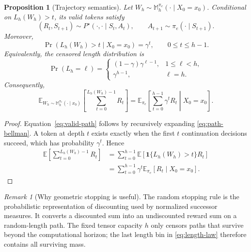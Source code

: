 \documentclass[11pt]{article}
\newtheorem{proposition}[theorem]{Proposition}
\theoremstyle{definition}
\theoremstyle{remark}
\newtheorem{remark}[theorem]{Remark}
\newcommand{\E}{\mathbb E}
\newcommand{\targetpi}{\pi_e}
\begin{document}
\begin{proposition}[Trajectory semantics]
\label{prop:path-semantics}
Let $W_h\sim\mathbb M_h^{\targetpi}(\cdot\mid X_0=x_0)$. Conditional on
$L_h(W_h)>t$, its valid tokens satisfy
\begin{equation}
(R_t,S_{t+1})
\sim
P^\star(\cdot,\cdot\mid S_t,A_t),
\qquad
A_{t+1}
\sim
\targetpi(\cdot\mid S_{t+1}).
\label{eq:valid-path}
\end{equation}
Moreover,
\begin{equation}
\Pr(L_h(W_h)>t\mid X_0=x_0)=\gamma^t,
\qquad
0\leq t\leq h-1.
\label{eq:survival}
\end{equation}
Equivalently, the censored length distribution is
\begin{equation}
\boxed{
\Pr(L_h=\ell)
=
\begin{cases}
(1-\gamma)\gamma^{\ell-1}, & 1\leq \ell<h,\\
\gamma^{h-1}, & \ell=h.
\end{cases}
}
\label{eq:length-law}
\end{equation}
Consequently,
\begin{equation}
\boxed{
\E_{W_h\sim\mathbb M_h^{\targetpi}(\cdot\mid x_0)}
\left[
\sum_{t=0}^{L_h(W_h)-1}R_t
\right]
=
\E_{\targetpi}
\left[
\sum_{t=0}^{h-1}\gamma^tR_t
\middle|
X_0=x_0
\right].
}
\label{eq:value-identity}
\end{equation}
\end{proposition}

\begin{proof}
Equation~\eqref{eq:valid-path} follows by recursively expanding
\cref{eq:path-bellman}. A token at depth $t$ exists exactly when the first
$t$ continuation decisions succeed, which has probability $\gamma^t$. Hence
\begin{align}
\E\left[\sum_{t=0}^{L_h(W_h)-1}R_t\right]
&=
\sum_{t=0}^{h-1}
\E\left[\bm 1\{L_h(W_h)>t\}R_t\right]
\\
&=
\sum_{t=0}^{h-1}
\gamma^t\E_{\targetpi}[R_t\mid X_0=x_0].
\end{align}
\end{proof}

\begin{remark}[Why geometric stopping is useful]
The random stopping rule is the probabilistic representation of
discounting used by normalized successor measures. It converts a discounted
sum into an undiscounted reward sum on a random-length path. The fixed tensor
capacity $h$ only censors paths that survive beyond the computational horizon;
the last length bin in \cref{eq:length-law} therefore contains all surviving
mass.
\end{remark}
\end{document}
